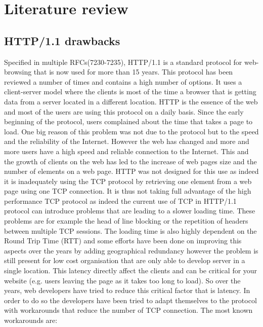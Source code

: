 \section{Literature review}
\label{relwork}
\subsection{HTTP/1.1 drawbacks}
Specified in multiple RFCs(7230-7235), HTTP/1.1 is a standard protocol for web-browsing that is now used for more than 15 years. This protocol has been reviewed a number of times and contains a high number of options. It uses a client-server model where the clients is most of the time a browser that is getting data from a server located in a different location. HTTP is the essence of the web and most of the users are using this protocol on a daily basis. 
Since the early beginning of the protocol, users complained about the time that takes a page to load. One big reason of this problem was not due to the protocol but to the speed and the reliability of the Internet. However the web has changed and more and more users have a high speed and reliable connection to the Internet. This and the growth of clients on the web has led to the increase of web pages size and the number of elements on a web page. HTTP was not designed for this use as indeed it is inadequately using the TCP protocol by retrieving one element from a web page using one TCP connection. It is thus not taking full advantage of the high performance TCP protocol as indeed the current use of TCP in HTTP/1.1 protocol can introduce problems that are leading to a slower loading time. These problems are for example the head of line blocking or the repetition of headers between multiple TCP sessions. The loading time is also highly dependent on the Round Trip Time (RTT) and some efforts have been done on improving this aspects over the years by adding geographical redundancy however the problem is still present for low cost organisation that are only able to develop server in a single location. 
This latency directly affect the clients and can be critical for your website (e.g. users leaving the page as it takes too long to load). So over the years, web developers have tried to reduce this critical factor that is latency. In order to do so the developers have been tried to adapt themselves to the protocol with workarounds that reduce the number of TCP connection. The most known workarounds are:
